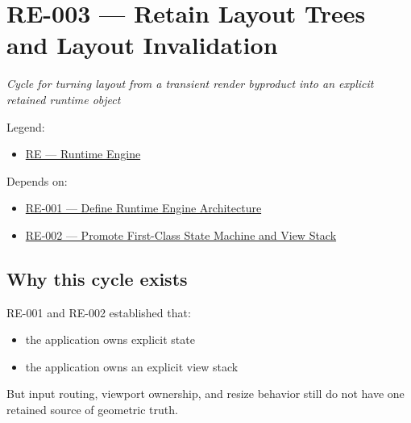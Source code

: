 \chapter{RE-003 --- Retain Layout Trees and Layout Invalidation}\label{record-151}

\smallskip

\emph{Cycle for turning layout from a transient render byproduct into an explicit retained runtime object}

Legend:

\begin{itemize}
\tightlist
\item
  \href{https://github.com/flyingrobots/bijou/blob/1853ad902f6bf219326409e7f743a5a1d6517dbc/docs/legends/RE-runtime-engine.md}{RE --- Runtime Engine}
\end{itemize}

Depends on:

\begin{itemize}
\tightlist
\item
  \href{https://github.com/flyingrobots/bijou/blob/cbd70612140e7a450d764b3c7be1c6af878b99bc/docs/design/RE-001-define-runtime-engine-architecture.md}{RE-001 --- Define Runtime Engine Architecture}
\item
  \href{https://github.com/flyingrobots/bijou/blob/cbd70612140e7a450d764b3c7be1c6af878b99bc/docs/design/RE-002-promote-first-class-state-machine-and-view-stack.md}{RE-002 --- Promote First-Class State Machine and View Stack}
\end{itemize}

\section{Why this cycle exists}\label{record-151-why-this-cycle-exists}

RE-001 and RE-002 established that:

\begin{itemize}
\tightlist
\item
  the application owns explicit state
\item
  the application owns an explicit view stack
\end{itemize}

But input routing, viewport ownership, and resize behavior still do not have one retained source of geometric truth.

